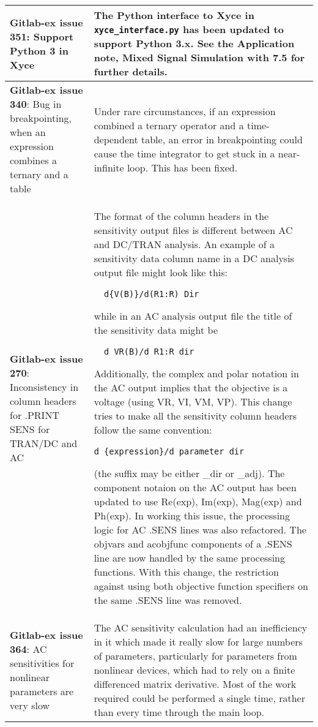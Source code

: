 {\begin{longtable}[h] {>{\raggedright\small}m{2in}|>{\raggedright\let\\\tabularnewline\small}m{3.5in}}
\textbf{Gitlab-ex issue 351}: Support Python 3 in Xyce &
  The Python interface to Xyce in \texttt{xyce\_interface.py}
  has been updated to support Python 3.x.  See the Application note, 
  Mixed Signal Simulation with \Xyce{} 7.5 for further details.  \\ \hline

\textbf{Gitlab-ex issue 340}: Bug in breakpointing, when an expression combines a ternary and a table &
  Under rare circumstances, if an expression combined a ternary operator and
  a time-dependent table, an error in breakpointing could cause the time integrator 
  to get stuck in a near-infinite loop.  This has been fixed.  \\ \hline
  
 \textbf{Gitlab-ex issue 270}: Inconsistency in column headers for .PRINT SENS for TRAN/DC and AC &
  The format of the column headers in the sensitivity output files is different
  between AC and DC/TRAN analysis. An example of a sensitivity data column name
  in a DC analysis output file might look like this:\begin{verbatim}
  d{V(B)}/d(R1:R)_Dir\end{verbatim}
  while in an AC analysis output file the title of the sensitivity data might be
  \begin{verbatim}
  d_VR(B)/d_R1:R_dir\end{verbatim}
  Additionally, the complex and polar notation in the AC output implies that the
  objective is a voltage (using VR, VI, VM, VP). This change tries to make all
  the sensitivity column headers follow the same convention:
  \begin{verbatim}d_{expression}/d_parameter_dir\end{verbatim}
  (the suffix may be either {\_}dir or {\_}adj). The component notaion on the AC
  output has been updated to use Re({exp}), Im({exp}), Mag({exp}) and Ph({exp}).
  In working this issue, the processing logic for AC .SENS lines was also
  refactored. The objvars and acobjfunc components of a .SENS line are now
  handled by the same processing functions. With this change, the restriction
  against using both objective function specifiers on the same .SENS line was
  removed. \\ \hline

\textbf{Gitlab-ex issue 364}:  AC sensitivities for nonlinear parameters are very slow & 
 The AC sensitivity calculation had an inefficiency in it which made it really 
 slow for large numbers of parameters, particularly for parameters from nonlinear 
 devices, which had to rely on a finite differenced matrix derivative.   Most 
 of the work required could be performed  a single time, rather than every time 
 through the main loop.  \\ \hline
 

\end{longtable}}
